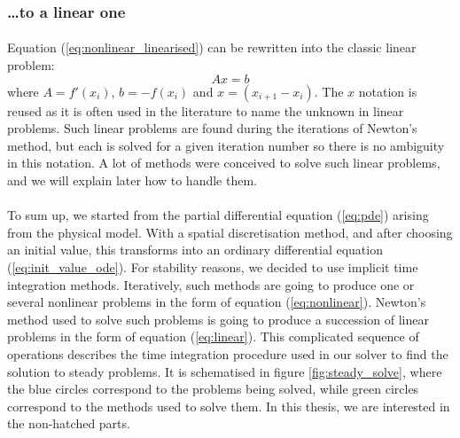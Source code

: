       \subsubsection{\dots to a linear one}

        \paragraph{}
        Equation (\ref{eq:nonlinear_linearised}) can be rewritten into the classic linear problem:
        \begin{equation}\label{eq:linear}
          Ax = b
        \end{equation}
        where $A = f'\left(x_i\right)$, $b = -f\left(x_i\right)$ and $x = \left( x_{i+1} - x_i \right)$.
        The $x$ notation is reused as it is often used in the literature to name the unknown in linear problems.
        Such linear problems are found during the iterations of Newton's method, but each is solved for a given iteration number so there is no ambiguity in this notation.
        A lot of methods were conceived to solve such linear problems, and we will explain later how to handle them.


      \paragraph{}
      To sum up, we started from the partial differential equation (\ref{eq:pde}) arising from the physical model.
      With a spatial discretisation method, and after choosing an initial value, this transforms into an ordinary differential equation (\ref{eq:init_value_ode}).
      For stability reasons, we decided to use implicit time integration methods.
      Iteratively, such methods are going to produce one or several nonlinear problems in the form of equation (\ref{eq:nonlinear}).
      Newton's method used to solve such problems is going to produce a succession of linear problems in the form of equation (\ref{eq:linear}).
      This complicated sequence of operations describes the time integration procedure used in our solver to find the solution to steady problems.
      It is schematised in figure \ref{fig:steady_solve}, where the blue circles correspond to the problems being solved, while green circles correspond to the methods used to solve them.
      In this thesis, we are interested in the non-hatched parts.

